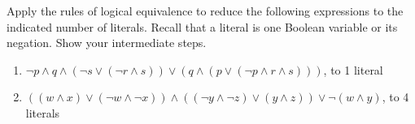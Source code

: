 \item[8] Apply the rules of logical equivalence to reduce the following expressions to the indicated number of literals. Recall that a literal is one Boolean variable or its negation. Show your intermediate steps.

\begin{enumerate}
    \item $\lnot p \land q \land (\lnot s \lor (\lnot r \land s)) \lor (q \land(p \lor (\lnot p \land r \land s)))$, to 1 literal
    \vspace{3.0in}
    \item $((w \land x)\lor(\lnot w \land \lnot x))\land((\lnot y \land \lnot z)\lor(y \land z))\lor \lnot(w \land y)$, to 4 literals
    \vspace{3.0in}
\end{enumerate}

\newpage